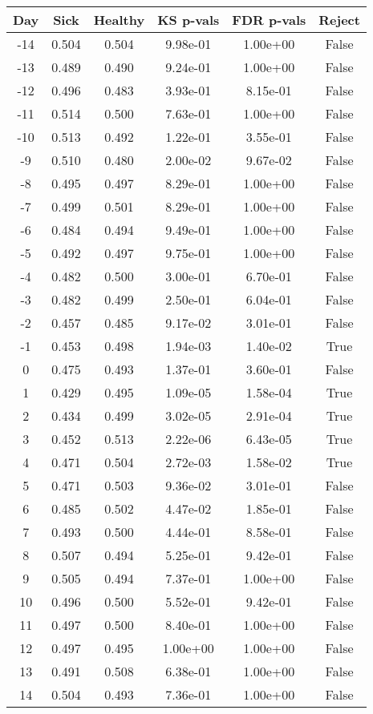 \begin{tabular}{c|c|c|c|c|c}
Day &  Sick & Healthy &  KS p-vals & FDR p-vals & Reject\\
\hline
-14 & 0.504 &   0.504 &   9.98e-01 &   1.00e+00 &  False\\
-13 & 0.489 &   0.490 &   9.24e-01 &   1.00e+00 &  False\\
-12 & 0.496 &   0.483 &   3.93e-01 &   8.15e-01 &  False\\
-11 & 0.514 &   0.500 &   7.63e-01 &   1.00e+00 &  False\\
-10 & 0.513 &   0.492 &   1.22e-01 &   3.55e-01 &  False\\
 -9 & 0.510 &   0.480 &   2.00e-02 &   9.67e-02 &  False\\
 -8 & 0.495 &   0.497 &   8.29e-01 &   1.00e+00 &  False\\
 -7 & 0.499 &   0.501 &   8.29e-01 &   1.00e+00 &  False\\
 -6 & 0.484 &   0.494 &   9.49e-01 &   1.00e+00 &  False\\
 -5 & 0.492 &   0.497 &   9.75e-01 &   1.00e+00 &  False\\
 -4 & 0.482 &   0.500 &   3.00e-01 &   6.70e-01 &  False\\
 -3 & 0.482 &   0.499 &   2.50e-01 &   6.04e-01 &  False\\
 -2 & 0.457 &   0.485 &   9.17e-02 &   3.01e-01 &  False\\
 -1 & 0.453 &   0.498 &   1.94e-03 &   1.40e-02 &   True\\
  0 & 0.475 &   0.493 &   1.37e-01 &   3.60e-01 &  False\\
  1 & 0.429 &   0.495 &   1.09e-05 &   1.58e-04 &   True\\
  2 & 0.434 &   0.499 &   3.02e-05 &   2.91e-04 &   True\\
  3 & 0.452 &   0.513 &   2.22e-06 &   6.43e-05 &   True\\
  4 & 0.471 &   0.504 &   2.72e-03 &   1.58e-02 &   True\\
  5 & 0.471 &   0.503 &   9.36e-02 &   3.01e-01 &  False\\
  6 & 0.485 &   0.502 &   4.47e-02 &   1.85e-01 &  False\\
  7 & 0.493 &   0.500 &   4.44e-01 &   8.58e-01 &  False\\
  8 & 0.507 &   0.494 &   5.25e-01 &   9.42e-01 &  False\\
  9 & 0.505 &   0.494 &   7.37e-01 &   1.00e+00 &  False\\
 10 & 0.496 &   0.500 &   5.52e-01 &   9.42e-01 &  False\\
 11 & 0.497 &   0.500 &   8.40e-01 &   1.00e+00 &  False\\
 12 & 0.497 &   0.495 &   1.00e+00 &   1.00e+00 &  False\\
 13 & 0.491 &   0.508 &   6.38e-01 &   1.00e+00 &  False\\
 14 & 0.504 &   0.493 &   7.36e-01 &   1.00e+00 &  False\\
\end{tabular}